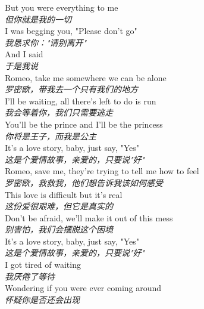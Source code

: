 \begin{spacing}{1.5}
\begin{flushleft}
But you were everything to me\\
\textit{但你就是我的一切}\\[0.5em]

I was begging you, "Please don't go"\\
\textit{我恳求你："请别离开"}\\[0.5em]

And I said\\
\textit{于是我说}\\[0.5em]

Romeo, take me somewhere we can be alone\\
\textit{罗密欧，带我去一个只有我们的地方}\\[0.5em]

I'll be waiting, all there's left to do is run\\
\textit{我会等着你，我们只需要逃走}\\[0.5em]

You'll be the prince and I'll be the princess\\
\textit{你将是王子，而我是公主}\\[0.5em]

It's a love story, baby, just say, "Yes"\\
\textit{这是个爱情故事，亲爱的，只要说"好"}\\[0.5em]

Romeo, save me, they're trying to tell me how to feel\\
\textit{罗密欧，救救我，他们想告诉我该如何感受}\\[0.5em]

This love is difficult but it's real\\
\textit{这份爱很艰难，但它是真实的}\\[0.5em]

Don't be afraid, we'll make it out of this mess\\
\textit{别害怕，我们会摆脱这个困境}\\[0.5em]

It's a love story, baby, just say, "Yes"\\
\textit{这是个爱情故事，亲爱的，只要说"好"}\\[0.5em]

I got tired of waiting\\
\textit{我厌倦了等待}\\[0.5em]

Wondering if you were ever coming around\\
\textit{怀疑你是否还会出现}\\[0.5em]


\end{flushleft}
\end{spacing}
